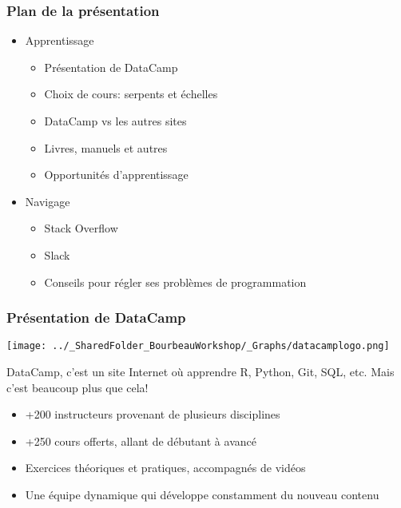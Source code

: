 \documentclass{beamer}
\begin{document}

    \begin{frame}
    
        \frametitle{Plan de la présentation} \vspace{1cm}
        
        \begin{itemize}
        
        \item{Apprentissage}
        
          \begin{itemize}
            \item Présentation de DataCamp 
            \item Choix de cours: serpents et échelles
            \item DataCamp vs les autres sites
            \item Livres, manuels et autres 
            \item Opportunités d'apprentissage
          \end{itemize}
        
         \item{Navigage}
         
          \begin{itemize}
            \item{Stack Overflow}
            \item{Slack}
            \item{Conseils pour régler ses problèmes de programmation}
          \end{itemize}
          
        \end{itemize}
        
    \end{frame}


    \begin{frame}
    
      \frametitle{Présentation de DataCamp} \vspace{1cm}
      
        \begin{center}
         \texttt{[image: ../\_SharedFolder\_BourbeauWorkshop/\_Graphs/datacamplogo.png]}
        \end{center} 
      
    DataCamp, c'est un site Internet où apprendre R, Python, Git, SQL, etc. Mais c'est beaucoup plus que cela!
    
        \begin{itemize}
          \item{+200 instructeurs provenant de plusieurs disciplines}
          \item{+250 cours offerts, allant de débutant à avancé}
          \item{Exercices théoriques et pratiques, accompagnés de vidéos}
          \item{Une équipe dynamique qui développe constamment du nouveau contenu}
        \end{itemize}
          
    \end{frame}
    
\end{document}
